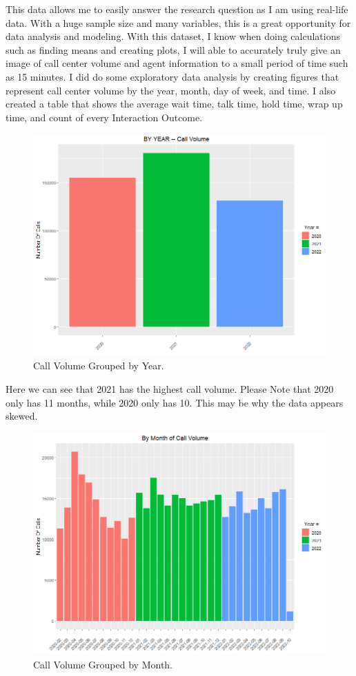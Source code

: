 \documentclass[12pt]{article}
\begin{document}
  This data allows me to easily answer the research question as I am using real-life data. With a huge sample size and many variables,
this is a great opportunity for data analysis and modeling. With this dataset, I know when doing calculations such as finding means and creating plots, 
I will able to accurately truly give an image of call center volume and agent information to a small period of time such as 15 minutes.
  I did do some exploratory data analysis by creating figures that represent call center volume by the year, month, day of week, and time. 
I also created a table that shows the average wait time, talk time, hold time, wrap up time, and count of every Interaction Outcome.
\begin{figure}[H]
  \centering
  \includegraphics[width=\textwidth]{By Year.png}
  \caption{Call Volume Grouped by Year.}
  \label{fig:Year}
\end{figure}
Here we can see that 2021 has the highest call volume. Please Note that 2020 only has 11 months, while 2020 only has 10. This may be why the data appears skewed.
\begin{figure}[H]
  \centering
  \includegraphics[width=\textwidth]{ByMonthVolume.png}
  \caption{Call Volume Grouped by Month.}
  \label{fig:Month}
\end{figure}
\end{document}
